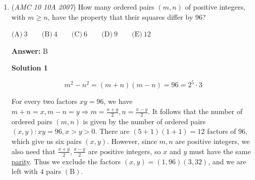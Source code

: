 \begin{enumerate}
 One way of finishing the sequence is by adding $568,682$ (before 824) to the sequence and adding them all together. After this, we just divide the result by each of the answer choices. Of the five, $37$ is the largest prime number that divides this sequence, so the answer is ${\boxed{(D)}}$.~Banspeedrun

 



\textbf{Solution 4 (a better way of doing solution 3)}

Because the question says which prime number will \textbf{ \textit{ ALWAYS }} divide $S$, the prime number would divide any sequence that follows the rule. So, to test this, create two sequences with three terms each- $111, 111, 111$ and $222, 222, 222$. The sum for both (respectively) is $333$ and $666$. Obviously, $3$ divides both. Now, test the other choices on both numbers, but don't if it doesn't divide one. An example is $\frac{333}{7}$. Because it doesn't divide, don't check $\frac{666}{7}$. Use the same logic for $\frac{333}{13}$. However, when you test $\frac{333}{37}$, it works. Now, you must check $\frac{666}{37}$ to ensure it isn't a special case. After doing this, you get that both are divisible. Now, check $\frac{333}{43}$ and see that it doesn't work. 

 
So the answer is ${\boxed{(D)}}$

 -N.

 


	\item (\textit{AMC 10 10A 2007}) How many ordered pairs $(m,n)$ of positive integers, with $m \ge n$, have the property that their squares differ by $96$? 


 $\text{(A)}\ 3 \qquad \text{(B)}\ 4 \qquad \text{(C)}\ 6 \qquad \text{(D)}\ 9 \qquad \text{(E)}\ 12$

 \textbf{Answer: }B



\textbf{Solution 1}


 \[m^2 - n^2 = (m+n)(m-n) = 96 = 2^{5} \cdot 3\] 

 For every two factors $xy = 96$, we have $m+n=x, m-n=y \Longrightarrow m = \frac{x+y}{2}, n = \frac{x-y}{2}$. It follows that the number of ordered pairs $(m,n)$ is given by the number of ordered pairs $(x,y): xy=96, x > y > 0$. There are $(5+1)(1+1) = 12$ factors of $96$, which give us six pairs $(x,y)$. However, since $m,n$ are positive integers, we also need that $\frac{x+y}{2}, \frac{x-y}{2}$ are positive integers, so $x$ and $y$ must have the same \href{https://artofproblemsolving.com/wiki/index.php?title=Parity}{parity}. Thus we exclude the factors $(x,y) = (1,96)(3,32)$, and we are left with $4$ pairs $\mathrm{(B)}$.


\end{enumerate}
